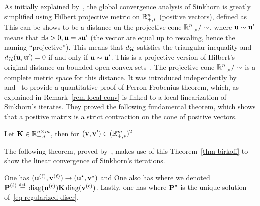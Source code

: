As initially explained by~\cite{franklin1989scaling}, the global convergence analysis of Sinkhorn is greatly simplified using Hilbert projective metric on $\RR_{+,*}^n$ (positive vectors), defined as
This can be shows to be a distance on the projective cone $\RR_{+,*}^n/\sim$, where $\uD \sim \uD'$ means that $\exists s>0, \uD=s\uD'$ (the vector are equal up to rescaling, hence the naming ``projective'').  
%
This means that $\Hilbert$ satisfies the triangular inequality and $\Hilbert(\uD,\uD')=0$ if and only if $\uD \sim \uD'$. 
%
This is a projective version of Hilbert's original distance on bounded open convex sets~\cite{hilbert1895gerade}.
%
The projective cone $\RR_{+,*}^n/\sim$ is a complete metric space for this distance. 
%
It was introduced independently by~\cite{birkhoff1957extensions} and~\cite{samelson1957perron} to provide a quantitative proof of Perron-Frobenius theorem, which, as explained in Remark~\ref{rem-local-conv} is linked to a local linearization of Sinkhorn's iterates. They proved the following fundamental theorem, which shows that a positive matrix is a strict contraction on the cone of positive vectors.

\begin{thm}\label{thm-birkoff}
	Let $\K \in \RR_{+,*}^{n \times m}$, then for $(\vD,\vD') \in (\RR_{+,*}^m)^2$
\end{thm}

The following theorem, proved by~\cite{franklin1989scaling}, makes use of this Theorem~\ref{thm-birkoff} to show the linear convergence of Sinkhorn's iterations.

\begin{thm}
	One has $(\it{\uD},\it{\vD}) \rightarrow (\uD^\star,\vD^\star)$ and
	One also has
	where we denoted $\it{\P} \eqdef \diag(\it{\uD}) \K \diag(\it{\vD})$. Lastly, one has
	\eql{\label{eq-convlin-sinkh-prim}
		\|\log(\it{\P}) - \log(\P^\star)\|_\infty \leq \Hilbert(\it{\uD}, \uD^\star) + \Hilbert(\it{\vD}, \vD^\star)
	}
	where $\P^\star$ is the unique solution of~\eqref{eq-regularized-discr}. 
\end{thm}


